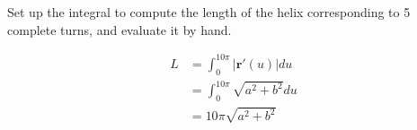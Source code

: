 Set up the integral to compute the length of the helix corresponding to 5 complete turns, and evaluate it by hand.

\begin{solution}
\begin{align*}
    L &= \int_{0}^{10\pi} |\boldsymbol{r}'(u)| du \\
    &= \int_{0}^{10\pi} \sqrt{a^2+b^2}du \\
    &= 10\pi \sqrt{a^2+b^2}
\end{align*}
\end{solution}